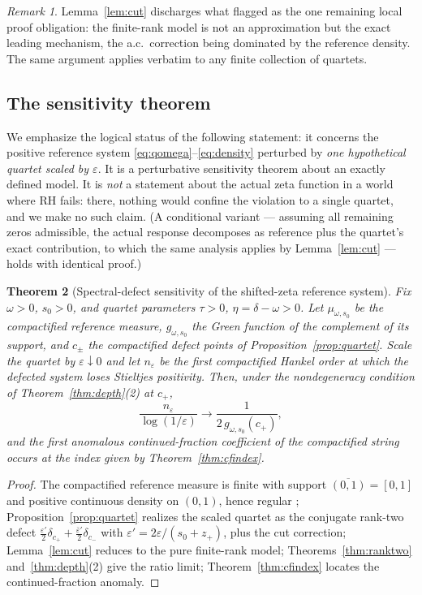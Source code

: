 \documentclass[11pt]{amsart}
\newtheorem{theorem}{Theorem}[section]
\theoremstyle{definition}
\theoremstyle{remark}
\newtheorem{remark}[theorem]{Remark}
\newcommand{\eps}{\varepsilon}
\begin{document}
\begin{remark}
Lemma~\ref{lem:cut} discharges what \cite{ROUND6} flagged as the one
remaining local proof obligation: the finite-rank model is not an
approximation but the exact leading mechanism, the a.c.\ correction being
dominated by the reference density. The same argument applies verbatim to
any finite collection of quartets.
\end{remark}

\subsection{The sensitivity theorem}

We emphasize the logical status of the following statement: it concerns the
positive reference system \eqref{eq:qomega}--\eqref{eq:density} perturbed by
\emph{one hypothetical quartet scaled by $\eps$}. It is a perturbative
sensitivity theorem about an exactly defined model. It is \emph{not} a
statement about the actual zeta function in a world where RH fails: there,
nothing would confine the violation to a single quartet, and we make no such
claim. (A conditional variant --- assuming all remaining zeros admissible,
the actual response decomposes as reference plus the quartet's exact
contribution, to which the same analysis applies by
Lemma~\ref{lem:cut} --- holds with identical proof.)

\begin{theorem}[Spectral-defect sensitivity of the shifted-zeta reference
system]\label{thm:zetadepth}
Fix $\omega>0$, $s_0>0$, and quartet parameters $\tau>0$,
$\eta=\delta-\omega>0$. Let $\mu_{\omega,s_0}$ be the compactified reference
measure, $g_{\omega,s_0}$ the Green function of the complement of its
support, and $c_\pm$ the compactified defect points of
Proposition~\ref{prop:quartet}. Scale the quartet by $\eps\downarrow0$ and
let $n_\eps$ be the first compactified Hankel order at which the defected
system loses Stieltjes positivity. Then, under the nondegeneracy condition
of Theorem~\ref{thm:depth}(2) at $c_+$,
\[
\frac{n_\eps}{\log(1/\eps)}
\longrightarrow
\frac1{2\,g_{\omega,s_0}(c_+)},
\]
and the first anomalous continued-fraction coefficient of the compactified
string occurs at the index given by Theorem~\ref{thm:cfindex}.
\end{theorem}

\begin{proof}
The compactified reference measure is finite with support
$\overline{(0,1)}=[0,1]$ and positive continuous density on $(0,1)$, hence
regular \cite{StahlTotik}; Proposition~\ref{prop:quartet} realizes the
scaled quartet as the conjugate rank-two defect
$\tfrac{\eps'}2\delta_{c_+}+\tfrac{\bar\eps'}2\delta_{c_-}$ with
$\eps'=2\eps/(s_0+z_+)$, plus the cut correction; Lemma~\ref{lem:cut}
reduces to the pure finite-rank model; Theorems~\ref{thm:ranktwo}
and~\ref{thm:depth}(2) give the ratio limit; Theorem~\ref{thm:cfindex}
locates the continued-fraction anomaly.
\end{proof}
\end{document}
